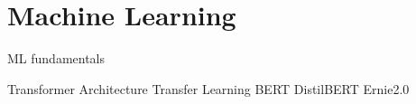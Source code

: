 \section{Machine Learning}
\label{chp:fundamentals:sec:machine_learning}
ML fundamentals

Transformer Architecture
Transfer Learning
BERT
DistilBERT
Ernie2.0
